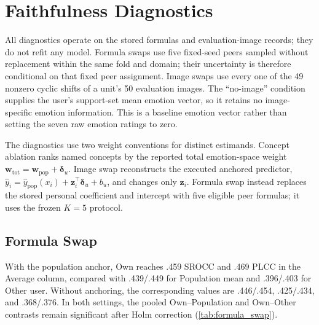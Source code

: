 \documentclass[10pt,twocolumn,letterpaper]{article}
\begin{document}
\section{Faithfulness Diagnostics}
\label{sec:supp_faithfulness}

All diagnostics operate on the stored formulas and evaluation-image records;
they do not refit any model. Formula swaps use five fixed-seed peers sampled
without replacement within the same fold and domain; their uncertainty is
therefore conditional on that fixed peer assignment. Image swaps use every
one of the 49 nonzero cyclic shifts of a unit's 50 evaluation images. The
``no-image'' condition supplies the user's support-set mean emotion vector,
so it retains no image-specific emotion information. This is a baseline
emotion vector rather than setting the seven raw emotion ratings to zero.

The diagnostics use two weight conventions for distinct estimands. Concept
ablation ranks named concepts by the reported total emotion-space weight
$\mathbf w_{\mathrm{tot}}=\mathbf w_{\mathrm{pop}}+\boldsymbol\delta_u$.
Image swap reconstructs the executed anchored predictor,
$\hat y_i=\hat y_{\mathrm{pop}}(x_i)+\mathbf z_i^\top
\boldsymbol\delta_u+b_u$, and changes only $\mathbf z_i$. Formula swap instead
replaces the stored personal coefficient and intercept with five eligible peer
formulas; it uses the frozen $K=5$ protocol.

\subsection{Formula Swap}

With the population anchor, Own reaches .459 SROCC and .469 PLCC in the
Average column, compared with .439/.449 for Population mean and .396/.403 for
Other user. Without anchoring, the corresponding values are .446/.454,
.425/.434, and .368/.376. In both settings, the pooled Own--Population and
Own--Other contrasts remain significant after Holm correction
(\cref{tab:formula_swap}).
\end{document}
